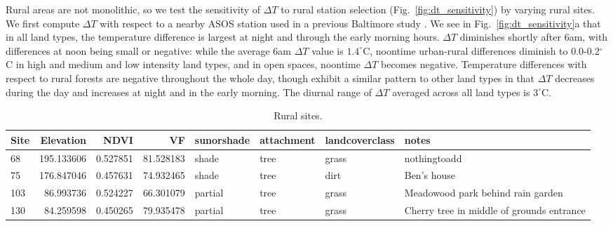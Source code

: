 \documentclass[draft,linenumbers]{agujournal}
\begin{document}
Rural areas are not monolithic, so we test the sensitivity of $\Delta T$ to rural station selection  (Fig.~\ref{fig:dt_sensitivity}) by varying rural sites.
 We first compute $\Delta T$ with  respect to a nearby ASOS station used in a previous Baltimore study \citep{li2013synergistic}. We see in Fig.~\ref{fig:dt_sensitivity}a that
in all land types, the temperature difference is largest at night and through the early morning hours.
$\Delta T$ diminishes shortly after 6am, with differences at noon being small or negative: while the average 6am $\Delta T$ value  is $1.4^\circ $C, noontime urban-rural differences diminish to 0.0-0.2$^\circ$C in high and medium and low intensity land types, and in open spaces, noontime $\Delta T$ becomes negative.
Temperature differences with respect to rural forests are negative throughout the whole day, though exhibit a similar pattern to other land types in that $\Delta T$ decreases during the day and increases at night and in the early morning. The diurnal range of $\Delta T$ averaged across all land types is $3^\circ$C. 

\begin{table}
\begin{tabular}{lrrrllll}
\toprule
Site &   Elevation &      NDVI &         VF & sunorshade & attachment & landcoverclass &                                      notes \\
\midrule
68  &  195.133606 &  0.527851 &  81.528183 &      shade &       tree &          grass &                               nothingtoadd \\
75  &  176.847046 &  0.457631 &  74.932465 &      shade &       tree &           dirt &                                Ben's house \\
103 &   86.993736 &  0.524227 &  66.301079 &    partial &       tree &          grass &          Meadowood park behind rain garden \\
130 &   84.259598 &  0.450265 &  79.935478 &    partial &       tree &          grass &  Cherry tree in middle of grounds entrance \\
\bottomrule
\end{tabular}

\caption{Rural sites.}
\label{tab:rural_ibuttons}
\end{table}
\end{document}
